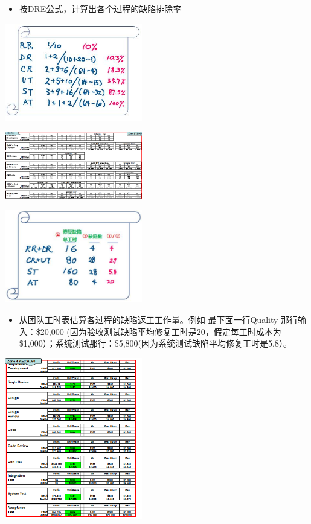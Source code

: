 \begin{itemize}
\tightlist
\item
  按DRE公式，计算出各个过程的缺陷排除率
\end{itemize}


\includegraphics[width=6cm]{2DreEstimateScreenshot_2021-12-01_2120491.jpg}

\includegraphics[width=6cm]{sjb1.PNG}




\includegraphics[width=6cm]{4reworkByPhaseScreenshot_2021-12-01_2148381.jpg}

\begin{itemize}
\tightlist
\item
  从团队工时表估算各过程的缺陷返工工作量。例如 最下面一行Quality
  那行输入：\$20,000 (因为验收测试缺陷平均修复工时是20，假定每工时成本为
  \$1,000）；系统测试那行：\$5,800(因为系统测试缺陷平均修复工时是5.8）。
\end{itemize}

\includegraphics[width=6cm]{微信截图_20231031153355.png}


